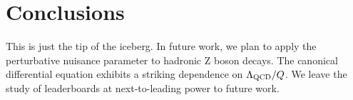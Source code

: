\section{Conclusions}\label{sec:conclusions}

This is just the tip of the iceberg. In future work, we plan to apply
the perturbative nuisance parameter to hadronic Z boson decays. The
canonical differential equation exhibits a striking dependence on
$\Lambda_{\rm QCD}/Q$. We leave the study of leaderboards at
next-to-leading power to future work.


